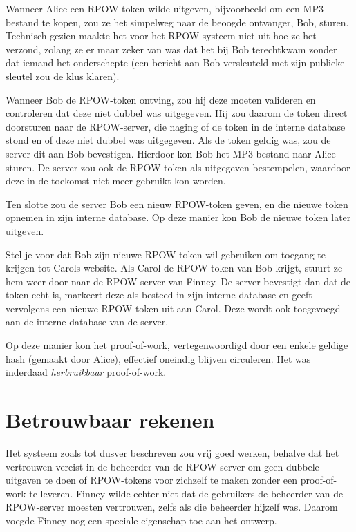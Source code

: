 \documentclass[
  a5paper,
  smalldemyvopaper,11pt,twoside,onecolumn,openright,extrafontsizes,
hidelinks]{memoir}
\begin{document}
Wanneer Alice een RPOW-token wilde uitgeven, bijvoorbeeld om een
MP3-bestand te kopen, zou ze het simpelweg naar de beoogde ontvanger,
Bob, sturen. Technisch gezien maakte het voor het RPOW-systeem niet uit
hoe ze het verzond, zolang ze er maar zeker van was dat het bij Bob
terechtkwam zonder dat iemand het onderschepte (een bericht aan Bob
versleuteld met zijn publieke sleutel zou de klus klaren).

Wanneer Bob de RPOW-token ontving, zou hij deze moeten valideren en
controleren dat deze niet dubbel was uitgegeven. Hij zou daarom de token
direct doorsturen naar de RPOW-server, die naging of de token in de
interne database stond en of deze niet dubbel was uitgegeven. Als de
token geldig was, zou de server dit aan Bob bevestigen. Hierdoor kon Bob
het MP3-bestand naar Alice sturen. De server zou ook de RPOW-token als
uitgegeven bestempelen, waardoor deze in de toekomst niet meer gebruikt
kon worden.

Ten slotte zou de server Bob een nieuw RPOW-token geven, en die nieuwe
token opnemen in zijn interne database. Op deze manier kon Bob de nieuwe
token later uitgeven.

Stel je voor dat Bob zijn nieuwe RPOW-token wil gebruiken om toegang te
krijgen tot Carols website. Als Carol de RPOW-token van Bob krijgt,
stuurt ze hem weer door naar de RPOW-server van Finney. De server
bevestigt dan dat de token echt is, markeert deze als besteed in zijn
interne database en geeft vervolgens een nieuwe RPOW-token uit aan
Carol. Deze wordt ook toegevoegd aan de interne database van de server.

Op deze manier kon het proof-of-work, vertegenwoordigd door een enkele
geldige hash (gemaakt door Alice), effectief oneindig blijven
circuleren. Het was inderdaad \emph{herbruikbaar} proof-of-work.

\section{Betrouwbaar rekenen}\label{betrouwbaar-rekenen}

Het systeem zoals tot dusver beschreven zou vrij goed werken, behalve
dat het vertrouwen vereist in de beheerder van de RPOW-server om geen
dubbele uitgaven te doen of RPOW-tokens voor zichzelf te maken zonder
een proof-of-work te leveren. Finney wilde echter niet dat de gebruikers
de beheerder van de RPOW-server moesten vertrouwen, zelfs als die
beheerder hijzelf was. Daarom voegde Finney nog een speciale eigenschap
toe aan het ontwerp.
\end{document}
